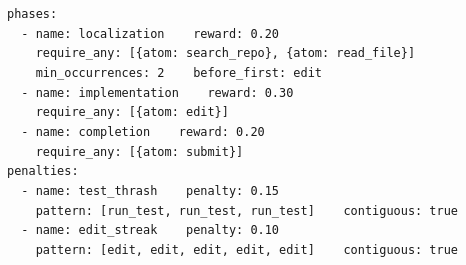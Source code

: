 \documentclass[11pt]{article}
\begin{document}
  \begin{tcolorbox}[
    colback=black!3,
    colframe=black!30,
    boxrule=0.4pt,
    left=10pt,
    right=10pt,
    top=8pt,
    bottom=8pt,
    fontupper=\small,
    title=\texttt{patch\_driven},
    coltitle=black!75,
    colbacktitle=black!8,
    fonttitle=\small,
    before skip=0pt,
    after skip=0pt
  ]
  \texttt{phases:}\\
  \texttt{~~- name: localization~~~~reward: 0.20}\\
  \texttt{~~~~require\_any: [\{atom: search\_repo\}, \{atom: read\_file\}]}\\
  \texttt{~~~~min\_occurrences: 2~~~~before\_first: edit}\\
  \texttt{~~- name: implementation~~~~reward: 0.30}\\
  \texttt{~~~~require\_any: [\{atom: edit\}]}\\
  \texttt{~~- name: completion~~~~reward: 0.20}\\
  \texttt{~~~~require\_any: [\{atom: submit\}]}\\
  \texttt{penalties:}\\
  \texttt{~~- name: test\_thrash~~~~penalty: 0.15}\\
  \texttt{~~~~pattern: [run\_test, run\_test, run\_test]~~~~contiguous: true}\\
  \texttt{~~- name: edit\_streak~~~~penalty: 0.10}\\
  \texttt{~~~~pattern: [edit, edit, edit, edit, edit]~~~~contiguous: true}
  \end{tcolorbox}




\end{document}

